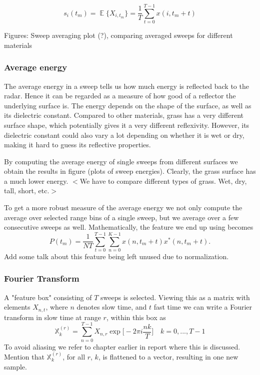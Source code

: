 \documentclass[a4paper, 12pt]{article}
\DeclareMathOperator*{\E}{\mathbb{E}}
\begin{document}
\begin{equation}
	s_i(t_m) = \E\{X_{i,t_m}\} = \frac{1}{T}\sum_{t=0}^{T-1}x(i, t_m + t)
\end{equation}

Figures: Sweep averaging plot (?), comparing averaged sweeps for different materials

\subsubsection{Average energy}
The average energy in a sweep tells us how much energy is reflected back to the radar. Hence it can be regarded as a measure of how good of a reflector the underlying surface is. The energy depends on the shape of the surface, as well as its dielectric constant. Compared to other materials, grass has a very different surface shape, which potentially gives it a very different reflexivity. However, its dielectric constant could also vary a lot depending on whether it is wet or dry, making it hard to guess its reflective properties.

By computing the average energy of single sweeps from different surfaces we obtain the results in figure (plots of sweep energies). Clearly, the grass surface has a much lower energy. $<$We have to compare different types of grass. Wet, dry, tall, short, etc.$>$

To get a more robust measure of the average energy we not only compute the average over selected range bins of a single sweep, but we average over a few consecutive sweeps as well. Mathematically, the feature we end up using becomes
\begin{equation}
	P(t_m) = \frac{1}{NT}\sum_{t=0}^{T-1}\sum_{n=0}^{K-1}x(n, t_m + t)x^*(n, t_m + t).
\end{equation}
Add some talk about this feature being left unused due to normalization.



\subsubsection{Fourier Transform}
A "feature box" consisting of $T$ sweeps is selected. Viewing this as a matrix with elements $X_{n,t}$, where $n$ denotes slow time, and $t$ fast time we can write a Fourier transform in slow time at range $r$, within this box as
\begin{equation}
	\mathbb{X}_k^{(r)} = \sum_{n=0}^{T-1}X_{n,r}\exp\Big[-2\pi i\frac{nk}{T}\Big] \quad k=0, ..., T-1
\end{equation}
To avoid aliasing we refer to chapter earlier in report where this is discussed. Mention that $\mathbb{X}_k^{(r)}$, for all $r$, $k$, is flattened to a vector, resulting in one new sample.
\end{document}
